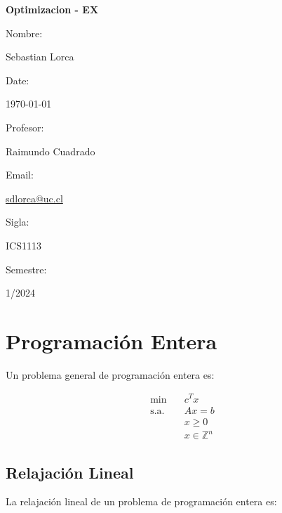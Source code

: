 \documentclass{article}
\begin{document}
\begin{titlepage}
    \centering
    \vspace*{2cm}
    {\Huge\bfseries Optimizacion - EX}\\[1cm]
    \vspace{1cm}
    {\Large Nombre: \par}
    {\large Sebastian Lorca\par}
    \vspace{0.5cm}
    {\Large Date: \par}
    {\large \today \par}
    \vspace{0.5cm}
    {\Large Profesor: \par}
    {\large Raimundo Cuadrado\par}
    \vspace{0.5cm}
    {\Large Email: \par}
    {\large \href{mailto:sdlorca@uc.cl}{sdlorca@uc.cl}\par}
    \vspace{0.5cm}
    {\Large Sigla: \par}
    {\large ICS1113\par}
    \vspace{0.5cm}
    {\Large Semestre: \par}
    {\large 1/2024\par}
    \vspace{1cm}
\end{titlepage}
\tableofcontents
\newpage


\section{Programaci\'on Entera}

Un problema general de programación entera es:

\begin{align*}
    \min \quad        & c^T x              \\
    \text{s.a.} \quad & Ax = b             \\
                      & x \geq 0           \\
                      & x \in \mathbb{Z}^n
\end{align*}

\subsection{Relajación Lineal}

La relajación lineal de un problema de programación entera es:
\end{document}
